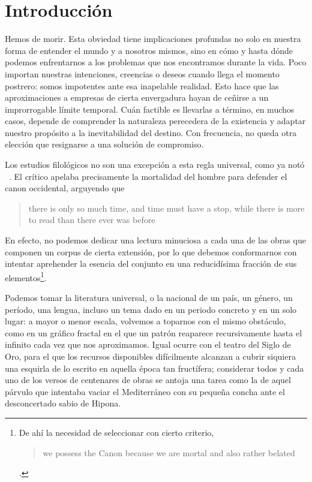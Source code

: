 \chapter{Introducción}
Hemos de morir. Esta obviedad tiene implicaciones profundas no solo en nuestra forma de entender el mundo y a nosotros mismos, sino en cómo y hasta dónde podemos enfrentarnos a los problemas que nos encontramos durante la vida. Poco importan nuestras intenciones, creencias o deseos cuando llega el momento postrero: somos impotentes ante esa inapelable realidad. Esto hace que las aproximaciones a empresas de cierta envergadura hayan de ceñirse a un improrrogable límite temporal. Cuán factible es llevarlas a término, en muchos casos, depende de comprender la naturaleza perecedera de la existencia y adaptar nuestro propósito a la inevitabilidad del destino. Con frecuencia, no queda otra elección que resignarse a una solución de compromiso. 

Los estudios filológicos no son una excepción a esta regla universal, como ya notó \citeauthor{bloom1995}~\parencite*[29]{bloom1995}. El crítico apelaba precisamente la mortalidad del hombre para defender el canon occidental, arguyendo que \blockquote{\begin{english}there is only so much time, and time must have a stop, while there is more to read than there ever was before\end{english}}. En efecto, no podemos dedicar una lectura minuciosa a cada una de las obras que componen un corpus de cierta extensión, por lo que debemos conformarnos con intentar aprehender la esencia del conjunto en una reducidísima fracción de sus elementos\footnote{De ahí la necesidad de seleccionar con cierto criterio, \blockquote{\begin{english}we possess the Canon because we are mortal and also rather belated\end{english}} \parencite[29]{bloom1995}.}. 

Podemos tomar la literatura universal, o la nacional de un país, un género, un período, una lengua, incluso un tema dado en un periodo concreto y en un solo lugar: a mayor o menor escala, volvemos a toparnos con el mismo obstáculo, como en un gráfico fractal en el que un patrón reaparece recursivamente hasta el infinito cada vez que nos aproximamos. Igual ocurre con el teatro del Siglo de Oro, para el que los recursos disponibles difícilmente alcanzan a cubrir siquiera una esquirla de lo escrito en aquella época tan fructífera; considerar todos y cada uno de los versos de centenares de obras se antoja una tarea como la de aquel párvulo que intentaba vaciar el Mediterráneo con su pequeña concha ante el desconcertado sabio de Hipona.

